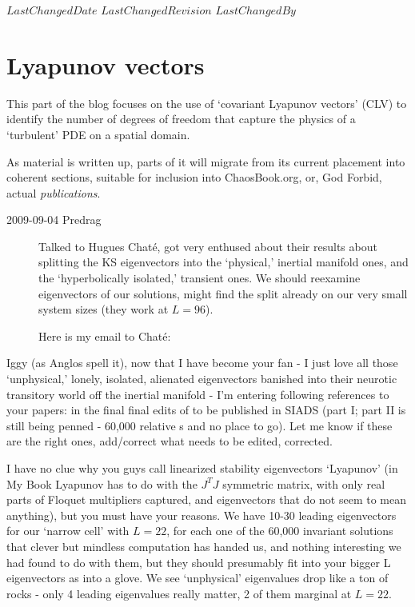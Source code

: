 \ifsvnmulti
 {$LastChangedDate$}
 {$LastChangedRevision$} {$LastChangedBy$}
\fi

\chapter{Lyapunov vectors}
\label{s:LyapunovVec}

This part of the blog focuses on the use of `covariant Lyapunov
vectors' (CLV) to identify the number of degrees of freedom
that capture the physics of a `turbulent' PDE on a spatial
domain.

As material is written up, parts of it will migrate from its
current placement into coherent sections, suitable for
inclusion into ChaosBook.org, or, God Forbid, actual {\em
publications}.

\begin{description}

\item[2009-09-04 Predrag]
Talked to  Hugues Chat\'{e}, got very
enthused about their results about splitting the KS
eigenvectors into the `physical,' inertial manifold ones,
and the `hyperbolically isolated,' transient ones. We should
reexamine eigenvectors of our solutions, might find the split
already on our very small system sizes (they work at $L=96$).

Here is my email to Chat\'{e}:

\end{description}

Iggy (as Anglos spell it),
%
now that I have become your fan - I just love all those `unphysical,'
lonely, isolated, alienated eigenvectors banished into their neurotic
transitory world off the inertial manifold -  I'm entering following
references to your papers:
in the final final edits of to be published in SIADS (part I;
part II is still being penned - 60,000 relative {\po s} and no
place to go). Let me know if these are the right ones, add/correct what
needs to be edited, corrected.

I have no clue why you guys call linearized stability
eigenvectors `Lyapunov' (in My Book Lyapunov has to do with
the $J^T J$ symmetric matrix, with only real parts of Floquet
multipliers captured, and eigenvectors that do not seem to
mean anything), but you must have your reasons. We have 10-30
leading eigenvectors for our `narrow cell' with $L=22$, for
each one of the 60,000 invariant solutions that clever but
mindless computation has handed us, and nothing interesting
we had found to do with them, but they should presumably fit
into your bigger L eigenvectors as into a glove. We see
`unphysical' eigenvalues drop like a ton of rocks - only 4
leading eigenvalues really matter, 2 of them marginal at
$L=22$.

